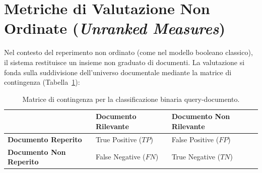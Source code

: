 \FloatBarrier
\section{Metriche di Valutazione Non Ordinate (\textit{Unranked Measures})}

Nel contesto del reperimento non ordinato (come nel modello booleano classico), il sistema restituisce un insieme non graduato di documenti. La valutazione si fonda sulla suddivisione dell'universo documentale mediante la matrice di contingenza (Tabella~\ref{tab:contingency-evaluation}):

\begin{table}[H]
\centering
\small
\begin{tabularx}{\textwidth}{l >{\centering\arraybackslash}X >{\centering\arraybackslash}X}
\toprule
& \textbf{Documento Rilevante} & \textbf{Documento Non Rilevante} \\
\midrule
\textbf{Documento Reperito} & True Positive ($TP$) & False Positive ($FP$) \\
\addlinespace
\textbf{Documento Non Reperito} & False Negative ($FN$) & True Negative ($TN$) \\
\bottomrule
\end{tabularx}
\caption{Matrice di contingenza per la classificazione binaria query-documento.}
\label{tab:contingency-evaluation}
\end{table}

